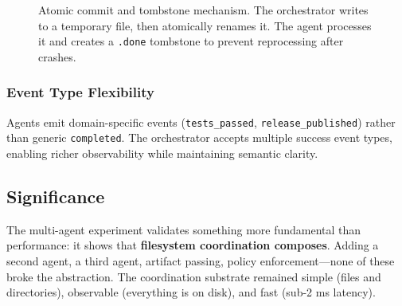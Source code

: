 \documentclass[11pt]{article}
\begin{document}
\begin{figure}[h]
\centering
{}
\caption{Atomic commit and tombstone mechanism. The orchestrator writes to a temporary file, then atomically renames it. The agent processes it and creates a \texttt{.done} tombstone to prevent reprocessing after crashes.}
\label{fig:tombstone}
\end{figure}

\subsubsection{Event Type Flexibility}

Agents emit domain-specific events (\texttt{tests\_passed}, \texttt{release\_published}) rather than generic \texttt{completed}. The orchestrator accepts multiple success event types, enabling richer observability while maintaining semantic clarity.

\subsection{Significance}

The multi-agent experiment validates something more fundamental than performance: it shows that \textbf{filesystem coordination composes}. Adding a second agent, a third agent, artifact passing, policy enforcement---none of these broke the abstraction. The coordination substrate remained simple (files and directories), observable (everything is on disk), and fast (sub-2 ms latency).
\end{document}
